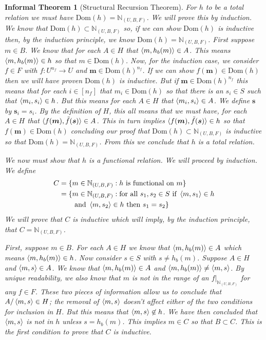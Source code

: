 \documentclass[12pt]{article}
\theoremstyle{break}
\theoremstyle{break}
\theoremstyle{break}
\theoremstyle{break}
\theoremstyle{break}
\newtheorem{informal definition}[definition]{Informal Definition}
\theoremstyle{break}
\newtheorem{informal theorem}[theorem]{Informal Theorem}
\newcommand{\bv}[1]{\boldsymbol{#1}}
\newcommand{\natnum}[0]{\mathbb{N}}
\begin{document}
\begin{informal theorem}[Structural Recursion Theorem]
		For $h$ to be a total relation we must have $\text{Dom}(h) = \natnum_{(U, B, F)}$. 
		We will prove this by induction. 
		We know that $\text{Dom}(h)\subset \natnum_{(U, B, F)}$ so, if we can show $\text{Dom}(h)$ is inductive then, by the induction principle, we know $\text{Dom}(h) = \natnum_{(U, B, F)}$.
		First suppose $m\in B$. 
		We know that for each $A \in H$ that $\braket{m, h_b(m)} \in A$.
		This means $\braket{m, h_b(m)} \in h$ so that $m\in \text{Dom}(h)$.
		Now, for the induction case, we consider $f\in F$ with $f:U^{n_f} \to U$ and $\bv{m}\in \text{Dom}(h)^{n_f}$.
		If we can show $f(\bv{m}) \in \text{Dom}(h)$ then we will have proven $\text{Dom}(h)$ is inductive.
		But if $\bv{m}\in \text{Dom}(h)^{n_f}$ this means that for each $i\in [n_f]$ that $m_i \in \text{Dom}(h)$ so that there is an $s_i \in S$ such that $\braket{m_i, s_i} \in h$.
		But this means for each $A\in H$ that $\braket{m_i, s_i} \in A$.
		We define $\bv{s}$ by $\bv{s}_i = s_i$.
		By the definition of $H$, this all means that we must have, for each $A\in H$ that $\braket{f(\bv{m}), \tilde{f}(\bv{s})} \in A$.
		This in turn implies $\braket{f(\bv{m}), \tilde{f}(\bv{s})} \in h$ so that $f(\bv{m}) \in \text{Dom}(h)$ concluding our proof that $\text{Dom}(h)\subset \natnum_{(U, B, F)}$ is inductive so that $\text{Dom}(h) = \natnum_{(U, B, F)}$.
		From this we conclude that $h$ is a total relation.
				
		We now must show that $h$ is a functional relation.
		We will proceed by induction.
		We define
		\begin{align*}
			C = \{&m\in \natnum_{(U, B, F)}: h \text{ is functional on } m\}\\
			= \{&m \in \natnum_{(U, B, F)}: \text{for all } s_1, s_2 \in S \text{ if } \braket{m, s_1} \in h\\
			& \text{ and } \braket{m, s_2} \in h\text{ then } s_1 = s_2\}
		\end{align*}
		We will prove that $C$ is inductive which will imply, by the induction principle, that $C = \natnum_{(U, B, F)}$.
		
		First, suppose $m\in B$.
		For each $A\in H$ we know that $\braket{m, h_b(m)} \in A$ which means $\braket{m, h_b(m)} \in h$.
		Now consider $s\in S$ with $s\not=h_b(m)$.
		Suppose $A\in H$ and $\braket{m, s}\in A$.
		We know that $\braket{m, h_b(m)}\in A$ and $\braket{m, h_b(m)}\not=\braket{m, s}$.
		By unique readability, we also know that $m$ is not in the range of an $f|_{\natnum_{(U, B, F)}}$ for any $f\in F$.
		These two pieces of information allow us to conclude that $A/\braket{m, s} \in H$; the removal of $\braket{m, s}$ doesn't affect either of the two conditions for inclusion in $H$.
		But this means that $\braket{m, s}\not \in h$.
		We have then concluded that $\braket{m, s}$ is not in $h$ unless $s=h_b(m)$.
		This implies $m\in C$ so that $B\subset C$.
		This is the first condition to prove that $C$ is inductive.
		

\end{informal theorem}
\end{document}

